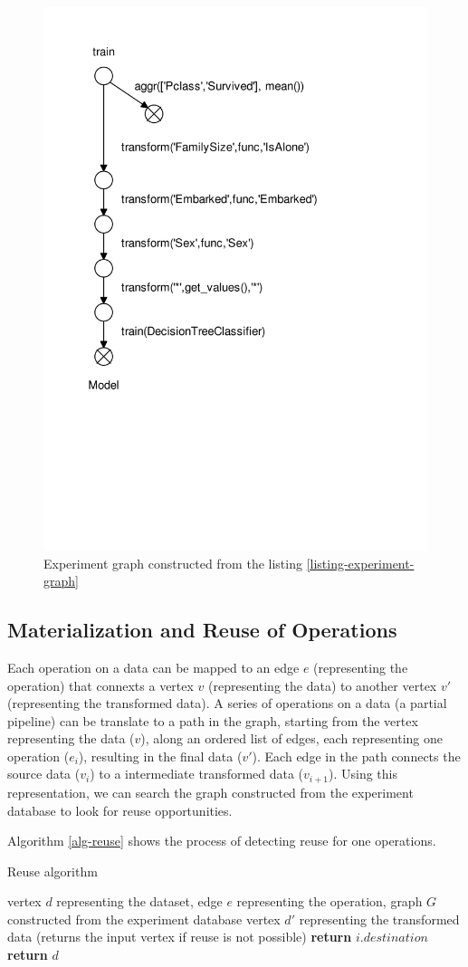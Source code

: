 \begin{figure}
\centering
\includegraphics[width=0.6\columnwidth]{../images/experiment-graph}
\caption{Experiment graph constructed from the listing \ref{listing-experiment-graph}}
\label{fig-experiment-graph}
\end{figure}

\subsection{Materialization and Reuse of Operations}\label{sub-sec-materializaiton-of-operations}
Each operation on a data can be mapped to an edge $e$ (representing the operation) that connexts a vertex $v$ (representing the data) to another vertex $v'$ (representing the transformed data).
A series of operations on a data (a partial pipeline) can be translate to a path in the graph, starting from the vertex representing the data ($v$), along an ordered list of edges, each representing one operation ($e_i$), resulting in the final data ($v'$). 
Each edge in the path connects the source data ($v_i$) to a intermediate transformed data ($v_{i+1}$).
Using this representation, we can search the graph constructed from the experiment database to look for reuse opportunities.

Algorithm \ref{alg-reuse} shows the process of detecting reuse for one operations.
\begin{algorithm}
\caption{Reuse algorithm}\label{alg-reuse}
\begin{algorithmic}[1]
\Require vertex $d$ representing the dataset, edge $e$ representing the operation, graph $G$ constructed from the experiment database
\Ensure vertex $d'$ representing the transformed data (returns the input vertex if reuse is not possible)
			 		 \State \textbf{return} $i.destination$
			 	\EndIf
		\EndFor
	\EndIf
   \State \textbf{return} $d$
\EndFunction
\end{algorithmic}
\end{algorithm}


